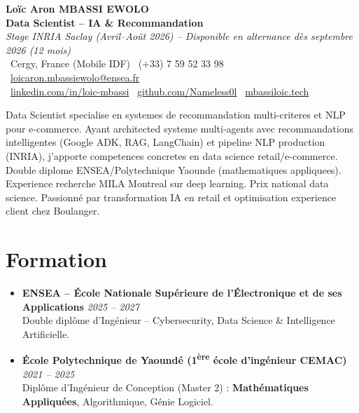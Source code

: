 \documentclass[a4paper,11pt]{article}
\begin{document}
\begin{center}
    {\Large \textbf{Lo\"ic Aron MBASSI EWOLO}} \\ \vspace{4pt}
    \textbf{\large Data Scientist -- IA \& Recommandation} \\
    \textit{\small Stage INRIA Saclay (Avril--Ao\^ut 2026) -- Disponible en alternance d\`es septembre 2026 (12 mois)} \\ \vspace{4pt}
    \small
    \faMapMarker\ Cergy, France (Mobile IDF) \quad
    \faPhone\ (+33) 7 59 52 33 98 \quad
    {\color{primary}\faEnvelope\ \href{mailto:loicaron.mbassiewolo@ensea.fr}{loicaron.mbassiewolo@ensea.fr}} \\ \vspace{2pt}
    {\color{primary}\faLinkedin\ \href{https://www.linkedin.com/in/loic-mbassi/}{linkedin.com/in/loic-mbassi}} \quad
    {\color{primary}\faGithub\ \href{https://github.com/Nameless0l}{github.com/Nameless0l}} \quad
    {\color{primary}\faGlobe\ \href{https://mbassiloic.tech}{mbassiloic.tech}}
\end{center}
\vspace{-6pt}
\noindent\small{Data Scientist specialise en systemes de recommandation multi-criteres et NLP pour e-commerce. Ayant architected systeme multi-agents avec recommandations intelligentes (Google ADK, RAG, LangChain) et pipeline NLP production (INRIA), j'apporte competences concretes en data science retail/e-commerce. Double diplome ENSEA/Polytechnique Yaounde (mathematiques appliquees). Experience recherche MILA Montreal sur deep learning. Prix national data science. Passionné par transformation IA en retail et optimisation experience client chez Boulanger.}

\section{Formation}
\begin{itemize}[leftmargin=*, label=\tiny$\bullet$, nosep]
    \item \textbf{ENSEA -- \'Ecole Nationale Sup\'erieure de l'\'Electronique et de ses Applications} \hfill \textit{2025 -- 2027} \\
    \small{Double dipl\^ome d'Ing\'enieur -- Cybersecurity, Data Science \& Intelligence Artificielle.}
    \item \textbf{\'Ecole Polytechnique de Yaound\'e (1\textsuperscript{\`ere} \'ecole d'ing\'enieur CEMAC)} \hfill \textit{2021 -- 2025} \\
    \small{Dipl\^ome d'Ing\'enieur de Conception (Master 2) : \textbf{Math\'ematiques Appliqu\'ees}, Algorithmique, G\'enie Logiciel.}
\end{itemize}
\end{document}
